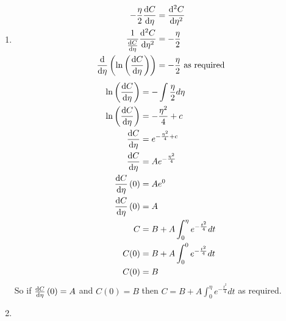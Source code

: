 \documentclass[10pt,\jkfside,a4paper]{article}
\begin{document}
\begin{enumerate}
\item 
\begin{equation}
\begin{split}
-\frac{\eta}{2}\dv{C}{\eta} &= \dv[2]{C}{\eta}\\
\frac{1}{\dv{C}{\eta}}\dv[2]{C}{\eta} &= -\frac{\eta}{2}\\
\dv{\eta}\left(\ln\left(\dv{C}{\eta}\right)\right) &= -\frac{\eta}{2} \text{ as required}\\
\end{split}
\end{equation}
\begin{equation}
\begin{split}
\ln\left(\dv{C}{\eta}\right) &= -\int\frac{\eta}{2} d\eta\\
\ln\left(\dv{C}{\eta}\right) &= - \frac{\eta^2}{4} + c\\
\dv{C}{\eta} &= e^{-\frac{\eta^2}{4} + c}\\
\dv{C}{\eta} &= Ae^{-\frac{\eta^2}{4}}\\
\dv{C}{\eta}\left(0\right) &= Ae^0\\
\dv{C}{\eta}\left(0\right) &= A\\
C &= B + A\int^\eta_0e^{-\frac{t^2}{4}}dt\\
C(0) &= B + A\int^0_0e^{-\frac{t^2}{4}}dt\\
C(0) &= B\\
\end{split}
\end{equation}
So if $\dv{C}{\eta}\left(0\right) = A$ and $C(0) = B$ then $C = B + A\int^\eta_0e^{-\frac{t^2}{4}}dt$ as required.

\item
\begin{enumerate}


\end{enumerate}
\end{enumerate}
\end{document}
